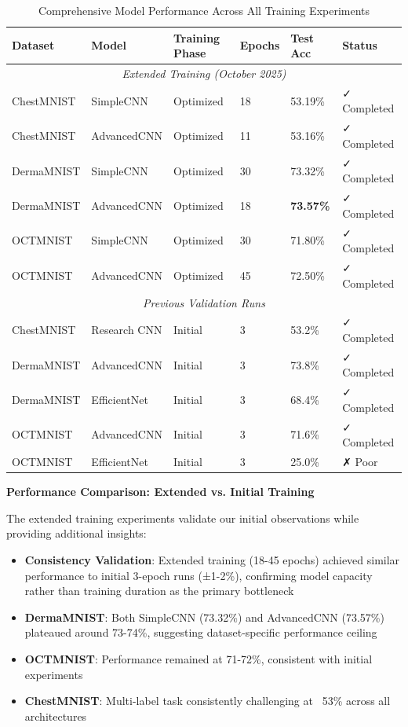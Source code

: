 \documentclass[12pt,a4paper]{article}
\begin{document}
\begin{table}[H]
\centering
\caption{Comprehensive Model Performance Across All Training Experiments}
\begin{tabular}{@{}llllll@{}}
\toprule
\textbf{Dataset} & \textbf{Model} & \textbf{Training Phase} & \textbf{Epochs} & \textbf{Test Acc} & \textbf{Status} \\ \midrule
\multicolumn{6}{c}{\textit{Extended Training (October 2025)}} \\
\midrule
ChestMNIST & SimpleCNN & Optimized & 18 & 53.19\% & ✓ Completed \\
ChestMNIST & AdvancedCNN & Optimized & 11 & 53.16\% & ✓ Completed \\
DermaMNIST & SimpleCNN & Optimized & 30 & 73.32\% & ✓ Completed \\
DermaMNIST & AdvancedCNN & Optimized & 18 & \textbf{73.57\%} & ✓ Completed \\
OCTMNIST & SimpleCNN & Optimized & 30 & 71.80\% & ✓ Completed \\
OCTMNIST & AdvancedCNN & Optimized & 45 & 72.50\% & ✓ Completed \\
\midrule
\multicolumn{6}{c}{\textit{Previous Validation Runs}} \\
\midrule
ChestMNIST & Research CNN & Initial & 3 & 53.2\% & ✓ Completed \\
DermaMNIST & AdvancedCNN & Initial & 3 & 73.8\% & ✓ Completed \\
DermaMNIST & EfficientNet & Initial & 3 & 68.4\% & ✓ Completed \\
OCTMNIST & AdvancedCNN & Initial & 3 & 71.6\% & ✓ Completed \\
OCTMNIST & EfficientNet & Initial & 3 & 25.0\% & ✗ Poor \\
\bottomrule
\end{tabular}
\label{tab:all_results}
\end{table}

\textbf{Performance Comparison: Extended vs. Initial Training}

The extended training experiments validate our initial observations while providing additional insights:

\begin{itemize}
    \item \textbf{Consistency Validation}: Extended training (18-45 epochs) achieved similar performance to initial 3-epoch runs (±1-2\%), confirming model capacity rather than training duration as the primary bottleneck
    \item \textbf{DermaMNIST}: Both SimpleCNN (73.32\%) and AdvancedCNN (73.57\%) plateaued around 73-74\%, suggesting dataset-specific performance ceiling
    \item \textbf{OCTMNIST}: Performance remained at 71-72\%, consistent with initial experiments
    \item \textbf{ChestMNIST}: Multi-label task consistently challenging at ~53\% across all architectures
\end{itemize}
\end{document}
